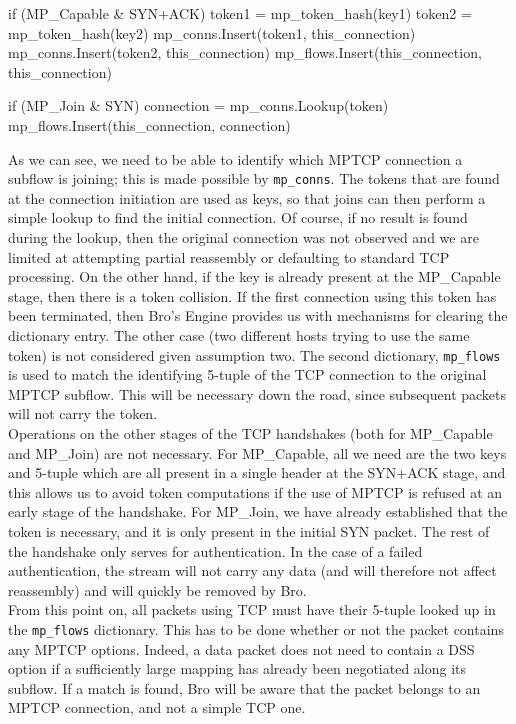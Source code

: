 \begin{code}
if (MP_Capable & SYN+ACK) {
	token1 = mp_token_hash(key1)
	token2 = mp_token_hash(key2)
	mp_conns.Insert(token1, this_connection)
	mp_conns.Insert(token2, this_connection)
	mp_flows.Insert(this_connection, this_connection)
}

if (MP_Join & SYN) {
	connection = mp_conns.Lookup(token)
	mp_flows.Insert(this_connection, connection)
}
\end{code}

As we can see, we need to be able to identify which MPTCP connection a subflow is joining; this is made possible by \texttt{mp\_conns}. The tokens that are found at the connection initiation are used as keys, so that joins can then perform a simple lookup to find the initial connection. Of course, if no result is found during the lookup, then the original connection was not observed and we are limited at attempting partial reassembly or defaulting to standard TCP processing. On the other hand, if the key is already present at the MP\_Capable stage, then there is a token collision. If the first connection using this token has been terminated, then Bro's Engine provides us with mechanisms for clearing the dictionary entry. The other case (two different hosts trying to use the same token) is not considered given assumption two. The second dictionary, \texttt{mp\_flows} is used to match the identifying 5-tuple of the TCP connection to the original MPTCP subflow. This will be necessary down the road, since subsequent packets will not carry the token. \\

Operations on the other stages of the TCP handshakes (both for MP\_Capable and MP\_Join) are not necessary. For MP\_Capable, all we need are the two keys and 5-tuple which are all present in a single header at the SYN+ACK stage, and this allows us to avoid token computations if the use of MPTCP is refused at an early stage of the handshake. For MP\_Join, we have already established that the token is necessary, and it is only present in the initial SYN packet. The rest of the handshake only serves for authentication. In the case of a failed authentication, the stream will not carry any data (and will therefore not affect reassembly) and will quickly be removed by Bro.\\

From this point on, all packets using TCP must have their 5-tuple looked up in the \texttt{mp\_flows} dictionary. This has to be done whether or not the packet contains any MPTCP options. Indeed, a data packet does not need to contain a DSS option if a sufficiently large mapping has already been negotiated along its subflow. If a match is found, Bro will be aware that the packet belongs to an MPTCP connection, and not a simple TCP one. \\

